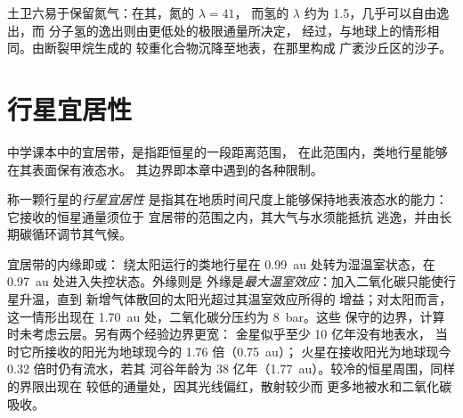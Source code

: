土卫六易于保留氮气：在其，氮的 $\lambda = 41$，
而氢的 $\lambda$ 约为 1.5，几乎可以自由逸出，而
分子氢的逸出则由更低处的极限通量所决定，
经过，与地球上的情形相同。由断裂甲烷生成的
较重化合物沉降至地表，在那里构成
广袤沙丘区的沙子。

\section{行星宜居性}\label{sec:b3:planetary-atmospheres:habitability}

中学课本中的宜居带，是指距恒星的一段距离范围，
在此范围内，类地行星能够在其表面保有液态水。
其边界即本章中遇到的各种限制。

\begin{definition}[行星宜居性]\label{def:b3:planetary-atmospheres:habitability}
称一颗行星的\emph{行星宜居性}
是指其在地质时间尺度上能够保持地表液态水的能力：
它接收的恒星通量须位于
宜居带的范围之内，其大气与水须能抵抗
逃逸，并由长期碳循环调节其气候。
\end{definition}

宜居带的内缘即或：
绕太阳运行的类地行星在
\qty{0.99}{au} 处转为湿温室状态，在 \qty{0.97}{au} 处进入失控状态。外缘则是
外缘是\emph{最大温室效应}：加入二氧化碳只能使行星升温，直到
新增气体散回的太阳光超过其温室效应所得的
增益；对太阳而言，这一情形出现在
\qty{1.70}{au} 处，二氧化碳分压约为 \qty{8}{bar}。这些
保守的边界，计算时未考虑云层。另有两个经验边界更宽：
金星似乎至少 10 亿年没有地表水，
当时它所接收的阳光为地球现今的 1.76 倍（\qty{0.75}{au}）；
火星在接收阳光为地球现今 0.32 倍时仍有流水，若其
河谷年龄为 38 亿年（\qty{1.77}{au}）。较冷的恒星周围，同样的界限出现在
较低的通量处，因其光线偏红，散射较少而
更多地被水和二氧化碳吸收。

